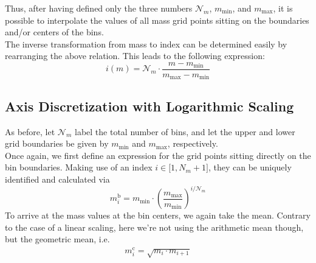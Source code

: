         Thus, after having defined only the three numbers $\mathcal N_m$, $m_\text{min}$, and 
        $m_\text{max}$, it is possible to interpolate the values of all mass grid points sitting on the 
        boundaries and/or centers of the bins.\\
        
        The inverse transformation from mass to index can be determined easily by rearranging the above 
        relation. This leads to the following expression:
        \begin{equation}
            i(m)
                =\mathcal N_m\cdot\frac{m-m_\text{min}}{m_\text{max}-m_\text{min}}
        \end{equation}
        
 
    \subsection{Axis Discretization with Logarithmic Scaling}
    \label{subsec:axis_discretization_with_logarithmic_scale}

        As before, let $\mathcal N_m$ label the total number of bins, and let the upper and lower grid 
        boundaries be given by $m_\text{min}$ and $m_\text{max}$, respectively.\\
        
        Once again, we first define an expression for the grid points sitting directly on the bin 
        boundaries. Making use of an index $i\in\mathcal[1,N_m+1]$, they can be uniquely identified and
        calculated via
        \begin{equation}
            m_i^\text{b}
                =m_\text{min}\cdot\left(\frac{m_\text{max}}{m_\text{min}}\right)^{i/\mathcal N_m}
        \end{equation}
        To arrive at the mass values at the bin centers, we again take the mean. Contrary to the case of 
        a linear scaling, here we're not using the arithmetic mean though, but the geometric mean, i.e.
        \begin{align}
            m_i^\text{c}
                =\sqrt{m_i\cdot m_{i+1}}
        \end{align}
    
